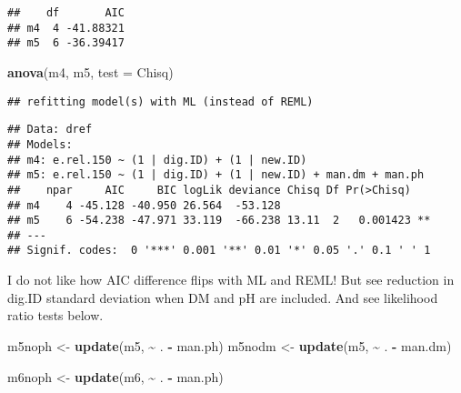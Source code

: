 \documentclass[
]{article}
\newenvironment{Shaded}{\begin{snugshade}}{\end{snugshade}}
\newcommand{\AttributeTok}[1]{\textcolor[rgb]{0.13,0.29,0.53}{#1}}
\newcommand{\FunctionTok}[1]{\textcolor[rgb]{0.13,0.29,0.53}{\textbf{#1}}}
\newcommand{\NormalTok}[1]{#1}
\newcommand{\OtherTok}[1]{\textcolor[rgb]{0.56,0.35,0.01}{#1}}
\newcommand{\SpecialCharTok}[1]{\textcolor[rgb]{0.81,0.36,0.00}{\textbf{#1}}}
\newcommand{\StringTok}[1]{\textcolor[rgb]{0.31,0.60,0.02}{#1}}
\begin{document}
\begin{verbatim}
##    df       AIC
## m4  4 -41.88321
## m5  6 -36.39417
\end{verbatim}

\begin{Shaded}
\begin{Highlighting}[]
\FunctionTok{anova}\NormalTok{(m4, m5, }\AttributeTok{test =} \StringTok{\textquotesingle{}Chisq\textquotesingle{}}\NormalTok{)}
\end{Highlighting}
\end{Shaded}

\begin{verbatim}
## refitting model(s) with ML (instead of REML)
\end{verbatim}

\begin{verbatim}
## Data: dref
## Models:
## m4: e.rel.150 ~ (1 | dig.ID) + (1 | new.ID)
## m5: e.rel.150 ~ (1 | dig.ID) + (1 | new.ID) + man.dm + man.ph
##    npar     AIC     BIC logLik deviance Chisq Df Pr(>Chisq)   
## m4    4 -45.128 -40.950 26.564  -53.128                       
## m5    6 -54.238 -47.971 33.119  -66.238 13.11  2   0.001423 **
## ---
## Signif. codes:  0 '***' 0.001 '**' 0.01 '*' 0.05 '.' 0.1 ' ' 1
\end{verbatim}

I do not like how AIC difference flips with ML and REML! But see
reduction in dig.ID standard deviation when DM and pH are included. And
see likelihood ratio tests below.

\begin{Shaded}
\begin{Highlighting}[]
\NormalTok{m5noph }\OtherTok{\textless{}{-}} \FunctionTok{update}\NormalTok{(m5, }\SpecialCharTok{\textasciitilde{}}\NormalTok{ . }\SpecialCharTok{{-}}\NormalTok{ man.ph)}
\NormalTok{m5nodm }\OtherTok{\textless{}{-}} \FunctionTok{update}\NormalTok{(m5, }\SpecialCharTok{\textasciitilde{}}\NormalTok{ . }\SpecialCharTok{{-}}\NormalTok{ man.dm)}
\end{Highlighting}
\end{Shaded}

\begin{Shaded}
\begin{Highlighting}[]
\NormalTok{m6noph }\OtherTok{\textless{}{-}} \FunctionTok{update}\NormalTok{(m6, }\SpecialCharTok{\textasciitilde{}}\NormalTok{ . }\SpecialCharTok{{-}}\NormalTok{ man.ph)}
\end{Highlighting}
\end{Shaded}
\end{document}
